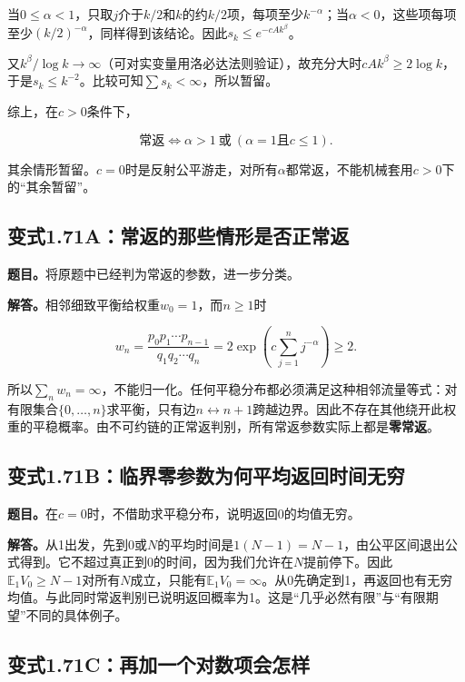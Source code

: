 \documentclass[
  11pt,a4paper,UTF8,fontset=fandol]{ctexart}
\begin{document}
当\(0\le\alpha<1\)，只取\(j\)介于\(k/2\)和\(k\)的约\(k/2\)项，每项至少\(k^{-\alpha}\)；当\(\alpha<0\)，这些项每项至少\((k/2)^{-\alpha}\)，同样得到该结论。因此\(s_k\le e^{-cAk^\beta}\)。

又\(k^\beta/\log k\to\infty\)（可对实变量用洛必达法则验证），故充分大时\(cAk^\beta\ge2\log k\)，于是\(s_k\le k^{-2}\)。比较可知\(\sum s_k<\infty\)，所以暂留。

综上，在\(c>0\)条件下，

\[\boxed{\text{常返}\iff\alpha>1\ \text{或}\ (\alpha=1\text{且}c\le1).}\]

其余情形暂留。\(c=0\)时是反射公平游走，对所有\(\alpha\)都常返，不能机械套用\(c>0\)下的``其余暂留''。

\subsection{变式1.71A：常返的那些情形是否正常返}\label{ux53d8ux5f0f1.71aux5e38ux8fd4ux7684ux90a3ux4e9bux60c5ux5f62ux662fux5426ux6b63ux5e38ux8fd4}

\textbf{题目。}将原题中已经判为常返的参数，进一步分类。

\textbf{解答。}相邻细致平衡给权重\(w_0=1\)，而\(n\ge1\)时

\[w_n=\frac{p_0p_1\cdots p_{n-1}}{q_1q_2\cdots q_n}
=2\exp\left(c\sum_{j=1}^nj^{-\alpha}\right)\ge2.\]

所以\(\sum_nw_n=\infty\)，不能归一化。任何平稳分布都必须满足这种相邻流量等式：对有限集合\(\{0,\ldots,n\}\)求平衡，只有边\(n\leftrightarrow n+1\)跨越边界。因此不存在其他绕开此权重的平稳概率。由不可约链的正常返判别，所有常返参数实际上都是\textbf{零常返}。

\subsection{变式1.71B：临界零参数为何平均返回时间无穷}\label{ux53d8ux5f0f1.71bux4e34ux754cux96f6ux53c2ux6570ux4e3aux4f55ux5e73ux5747ux8fd4ux56deux65f6ux95f4ux65e0ux7a77}

\textbf{题目。}在\(c=0\)时，不借助求平稳分布，说明返回0的均值无穷。

\textbf{解答。}从1出发，先到0或\(N\)的平均时间是\(1(N-1)=N-1\)，由公平区间退出公式得到。它不超过真正到0的时间，因为我们允许在\(N\)提前停下。因此\(\mathbb E_1V_0\ge N-1\)对所有\(N\)成立，只能有\(\mathbb E_1V_0=\infty\)。从0先确定到1，再返回也有无穷均值。与此同时常返判别已说明返回概率为1。这是``几乎必然有限''与``有限期望''不同的具体例子。

\subsection{变式1.71C：再加一个对数项会怎样}\label{ux53d8ux5f0f1.71cux518dux52a0ux4e00ux4e2aux5bf9ux6570ux9879ux4f1aux600eux6837}
\end{document}
